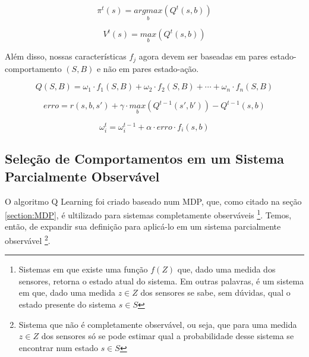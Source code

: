 \begin{equation} \label{equation:PolicySelectionBehavior}
    \pi^t \left( s \right) = \underset{b}{argmax} \left( Q^t \left( s, b \right) \right)
\end{equation}

\begin{equation}
    V^t \left( s \right) = \underset{b}{max} \left( Q^t \left( s, b \right) \right)
\end{equation}

Além disso, nossas características $ f_j $ agora devem ser baseadas em pares estado-comportamento $ \left( S, B \right) $ e não em pares estado-ação.

\begin{equation}
	Q \left( S, B \right) = \omega_1 \cdot f_1 \left( S, B \right) + \omega_2 \cdot f_2 \left( S, B \right) + \cdots + \omega_n \cdot f_n \left( S, B \right)
\end{equation}

\begin{equation} \label{equation:QErrorBehavior}
	erro = r \left( s, b, s' \right) + \gamma \cdot \underset{b}{max} \left( Q^{t-1} \left( s', b' \right) \right) - Q^{t-1} \left( s, b \right)
\end{equation}

\begin{equation} \label{equation:OmegaUpdateBehavior}
	\omega_i^t = \omega_i^{t-1} + \alpha \cdot erro \cdot f_i \left( s, b \right)
\end{equation}


\subsection{Seleção de Comportamentos em um Sistema Parcialmente Observável} \label{subsection:QLearningParcialmenteObservavel}

O algoritmo Q Learning foi criado baseado num MDP, que, como citado na seção \ref{section:MDP}, é ultilizado para sistemas completamente observáveis%
\footnote{Sistemas em que existe uma função $ f \left( Z \right) $ que, dado uma medida dos sensores, retorna o estado atual do sistema. Em outras palavras, é um sistema em que, dado uma medida $ z \in Z $ dos sensores se sabe, sem dúvidas, qual o estado presente do sistema $ s \in S $%
}. Temos, então, de expandir sua definição para aplicá-lo em um sistema parcialmente observável%
\footnote{Sistema que não é completamente observável, ou seja, que para uma medida $ z \in Z $ dos sensores só se pode estimar qual a probabilidade desse sistema se encontrar num estado $ s \in S $%
}.

